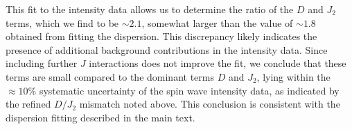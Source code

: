 \documentclass[aps, prl, twocolumn, superscriptaddress, longbibliography]{revtex4-2}
\begin{document}
This fit to the intensity data allows us to determine the ratio of the $D$ and $J_2$ terms, which we find to be $\sim 2.1$, somewhat larger than the value of $\sim 1.8$ obtained from fitting the dispersion. This discrepancy likely indicates the presence of additional background contributions in the intensity data. Since including further $J$ interactions does not improve the fit, we conclude that these terms are small compared to the dominant terms $D$ and $J_2$, lying within the $\approx 10\%$ systematic uncertainty of the spin wave intensity data, as indicated by the refined $D/J_2$ mismatch noted above. This conclusion is consistent with the dispersion fitting described in the main text. \\
\end{document}

